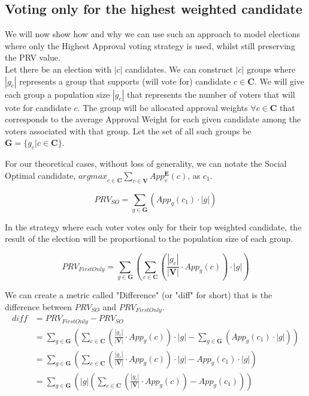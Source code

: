 \documentclass{article}
\begin{document}
\subsection{Voting only for the highest weighted candidate}
We will now show how and why we can use such an approach to model elections where only the Highest Approval voting strategy is used, whilst still preserving the PRV value.\\

Let there be an election with $|c|$ candidates. We can construct $|c|$ groups where $|g_c|$ represents a group that supports (will vote for) candidate $c \in \boldsymbol{C}$. We will give each group a population size $|g_c|$ that represents the number of voters that will vote for candidate $c$. The group will be allocated approval weights $\forall c \in \boldsymbol{C}$ that corresponds to the average Approval Weight for each given candidate among the voters associated with that group. Let the set of all such groups be $\boldsymbol{G} = \{g_c | c \in \boldsymbol{C}\}$.

For our theoretical cases, without loss of generality, we can notate the Social Optimal candidate, ${argmax}_{c \in \boldsymbol{C}} \sum^{}_{v \in \boldsymbol{V}}{App^{\boldsymbol{E}}_{v}(c)}$, as $c_1$.

\begin{equation}
     PRV_{SO} = \sum^{}_{g \in \boldsymbol{G}}{\left(App_g(c_1)\cdot|g|\right)} 
\end{equation}

In the strategy where each voter votes only for their top weighted candidate, the result of the election will be proportional to the population size of each group.

\begin{equation}
     PRV_{FirstOnly} = \sum^{}_{g \in \boldsymbol{G}}{\left(\sum^{}_{c \in \boldsymbol{C}}{\left(\frac{|g_c|}{|\boldsymbol{V}|} \cdot App_g(c)\right)} \cdot |g|\right)} 
\end{equation} 

We can create a metric called "Difference" (or "diff" for short) that is the difference between $PRV_{SO}$ and $PRV_{FirstOnly}$.
\begin{equation}\label{DIFF_EQN_0}
\begin{aligned}
{diff} &= PRV_{FirstOnly} - PRV_{SO}\\
&= \sum^{}_{g \in \boldsymbol{G}}{\left(\sum^{}_{c \in \boldsymbol{C}}{\left(\frac{|g_c|}{|\boldsymbol{V}|} \cdot App_g(c)\right)} \cdot |g| - \sum^{}_{g \in \boldsymbol{G}}{\left(App_g(c_1)\cdot|g|\right)}\right)}\\
&= \sum^{}_{g \in \boldsymbol{G}}{\left(\sum^{}_{c \in \boldsymbol{C}}{\left(\frac{|g_c|}{|\boldsymbol{V}|} \cdot App_g(c)\right)} \cdot |g| - App_g(c_1)\cdot|g|\right)}\\
&= \sum^{}_{g \in \boldsymbol{G}}{\left(|g|\left(\sum^{}_{c \in \boldsymbol{C}}{\left(\frac{|g_c|}{|\boldsymbol{V}|} \cdot App_g(c)\right)} - App_g(c_1)\right)\right)}
\end{aligned}
\end{equation}\\
\end{document}
